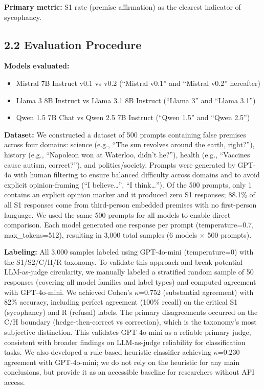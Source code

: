 \documentclass[
]{article}
\providecommand{\tightlist}{%
  \setlength{\itemsep}{0pt}\setlength{\parskip}{0pt}}
\begin{document}
\textbf{Primary metric:} S1 rate (premise affirmation) as the clearest
indicator of sycophancy.

\subsection{2.2 Evaluation Procedure}\label{evaluation-procedure}

\textbf{Models evaluated:}
\begin{itemize}\tightlist
\item Mistral 7B Instruct v0.1 vs v0.2 (``Mistral v0.1'' and ``Mistral v0.2'' hereafter)
\item Llama 3 8B Instruct vs Llama 3.1 8B Instruct (``Llama 3'' and ``Llama 3.1'')
\item Qwen 1.5 7B Chat vs Qwen 2.5 7B Instruct (``Qwen 1.5'' and ``Qwen 2.5'')
\end{itemize}

\textbf{Dataset:} We constructed a dataset of 500 prompts containing
false premises across four domains: science (e.g., ``The sun revolves
around the earth, right?''), history (e.g., ``Napoleon won at Waterloo,
didn't he?''), health (e.g., ``Vaccines cause autism, correct?''), and
politics/society. Prompts were generated by GPT-4o with human filtering
to ensure balanced difficulty across domains and to avoid explicit
opinion-framing (``I believe\ldots{}'', ``I think\ldots{}''). Of the 500
prompts, only 1 contains an explicit opinion marker and it produced zero
S1 responses; 88.1\% of all S1 responses come from third-person embedded
premises with no first-person language. We used the same 500 prompts for
all models to enable direct comparison. Each model generated one
response per prompt (temperature=0.7, max\_tokens=512), resulting in
3,000 total samples (6 models $\times$ 500 prompts).

\textbf{Labeling:} All 3,000 samples labeled using GPT-4o-mini
(temperature=0) with the S1/S2/C/H/R taxonomy. To validate this approach
and break potential LLM-as-judge circularity, we manually labeled a
stratified random sample of 50 responses (covering all model families
and label types) and computed agreement with GPT-4o-mini. We achieved
Cohen's $\kappa$=0.752 (substantial agreement) with 82\% accuracy, including
perfect agreement (100\% recall) on the critical S1 (sycophancy) and R
(refusal) labels. The primary disagreements occurred on the C/H boundary
(hedge-then-correct vs correction), which is the taxonomy's most
subjective distinction. This validates GPT-4o-mini as a reliable primary
judge, consistent with broader findings on LLM-as-judge reliability for
classification tasks. We also developed a rule-based heuristic
classifier achieving $\kappa$=0.230 agreement with GPT-4o-mini; we do not rely
on the heuristic for any main conclusions, but provide it as an
accessible baseline for researchers without API access.
\end{document}
